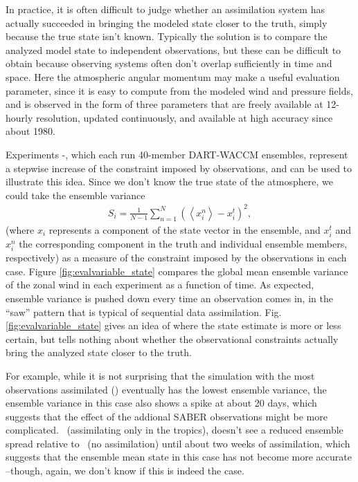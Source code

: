 In practice, it is often difficult to judge whether an assimilation system has actually succeeded in bringing the modeled state closer to the truth, simply because the true state isn't known. 
Typically the solution is to compare the analyzed model state to independent observations, but these can be difficult to obtain because observing systems often don't overlap sufficiently in time and space.
Here the atmospheric angular momentum may make a useful evaluation parameter, since it is easy to compute from the modeled wind and pressure fields, and is observed in the form of three parameters that are freely available at 12-hourly resolution, updated continuously, and available at high accuracy since about 1980.  

Experiments \WACCMNODA-\NCARFULL, which each run 40-member DART-WACCM ensembles, 
represent a stepwise increase of the constraint imposed by observations, and can be used to illustrate this idea.
Since we don't know the true state of the atmosphere, we could take the ensemble variance 
\begin{eqnarray}
S_i = 
\frac{1}{N-1}
\sum_{n=1}^N
\left(
	\left< x_{i}^{n} \right>-x_i^t
\right)^2,
\label{eq:spread}
\end{eqnarray}
(where $x_{i}$ represents a component of the state vector in the ensemble,  and $x_{i}^t$ and $x_{i}^n$ the corresponding component in the truth and individual ensemble members, respectively) as a measure of the constraint imposed by the observations in each case. 
Figure \ref{fig:evalvariable_state} compares 
the global mean ensemble variance of the zonal wind in each experiment as a function of time.  
As expected, ensemble variance is pushed down every time an observation comes in, in the ``saw'' pattern that is typical of sequential data assimilation. 
Fig.  \ref{fig:evalvariable_state} gives an idea of where the state estimate is more or less certain, but tells nothing about whether the observational constraints actually bring the analyzed state closer to the truth. 

For example, while it is not surprising that the simulation with the most observations assimilated (\NCARFULL) eventually has the lowest ensemble variance, the ensemble variance in this case also shows a spike at about 20 days, which suggests that the effect of the addional SABER observations might be more complicated. 
\WACCMTROPICS~(assimilating only in the tropics), doesn't see a reduced ensemble spread relative to \NODA~(no assimilation) until about two weeks of assimilation, which suggests that the ensemble mean state in this case has not become more accurate --though, again, we don't know if this is indeed the case.  


